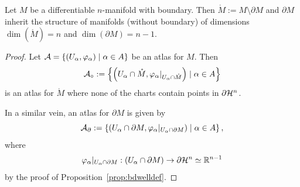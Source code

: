 \begin{proposition}
  Let $M$ be a differentiable $n$-manifold with boundary.
  Then $\mathring M := M\setminus\partial M$ and $\partial M$ inherit the structure of manifolds (without boundary) of dimensions $\dim(\mathring M)=n$ and $\dim(\partial M) = n-1$.
\end{proposition}
\begin{proof}
  Let $\mathcal{A} = \{(U_\alpha,\varphi_\alpha) \mid \alpha\in A\}$ be an atlas for $M$. 
  Then
  \begin{equation}
    \mathcal{A}_\circ := \left\{
      \left(
        U_\alpha \cap \mathring M,
        \varphi_\alpha|_{U_\alpha \cap \mathring M}
        \right) \mid \alpha\in A
      \right\}
  \end{equation}
  is an atlas for $\mathring M$ where none of the charts contain points in $\partial\mathcal{H}^n$.

  In a similar vein, an atlas for $\partial M$ is given by
  \begin{equation}
    \mathcal{A}_\partial := \left\{
      \left(
        U_\alpha \cap \partial M,
        \varphi_\alpha|_{U_\alpha \cap \partial M}
        \right) \mid \alpha\in A
      \right\},
  \end{equation}
  where
  \begin{equation}
    \varphi_\alpha|_{U_\alpha \cap \partial M} : (U_\alpha \cap \partial M) \to \partial\mathcal{H}^n\simeq\mathbb{R}^{n-1}
  \end{equation}
  by the proof of Proposition~\ref{prop:bdwelldef}.
\end{proof}

